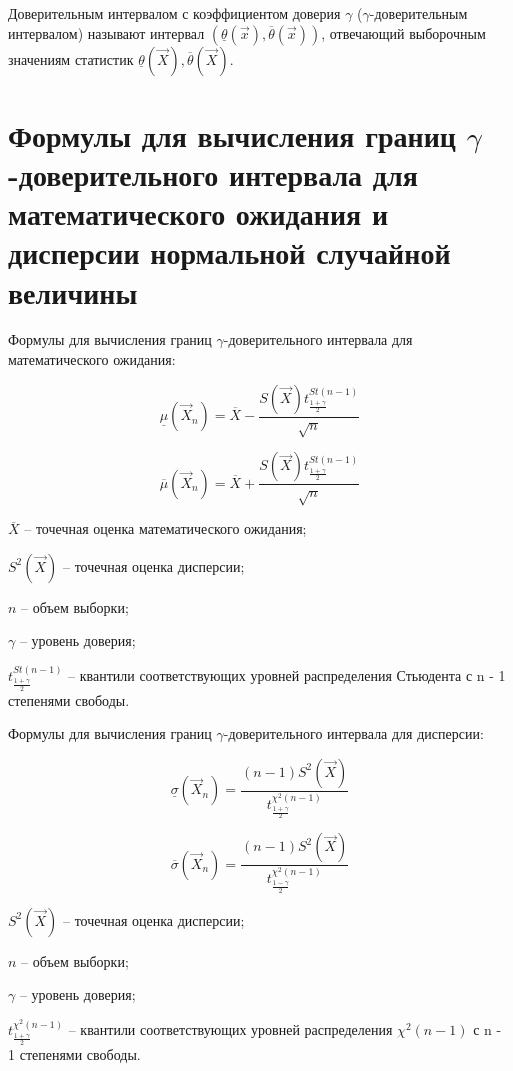 \documentclass[a4paper,oneside,12pt]{extreport}
\theoremstyle{indented}
\begin{document}
Доверительным интервалом с коэффициентом доверия $\gamma$ ($\gamma$-доверительным интервалом) называют интервал $(\underline{\theta}(\vec x), \overline{\theta}(\vec x))$, отвечающий выборочным значениям статистик $\underline{\theta}(\vec X), \overline{\theta}(\vec X)$. 

\section{Формулы для вычисления границ $\gamma$-доверительного интервала для математического ожидания и дисперсии нормальной случайной величины}

Формулы для вычисления границ $\gamma$-доверительного интервала для математического ожидания:

$$
\underline\mu(\vec X_n)=\overline X - \frac{S(\vec X)t^{St(n-1)}_{\frac{1+\gamma}{2}}}{\sqrt{n}}
$$

$$
\overline\mu(\vec X_n)=\overline X + \frac{S(\vec X)t^{St(n-1)}_{\frac{1+\gamma}{2}}}{\sqrt{n}}
$$

$\overline X$ -- точечная оценка математического ожидания;

$S^2(\vec X)$ -- точечная оценка дисперсии;

$n$ -- объем выборки;

$\gamma$ -- уровень доверия;

$t^{St(n-1)}_{\frac{1+\gamma}{2}}$ -- квантили соответствующих уровней распределения Стьюдента с n - 1 степенями свободы.

Формулы для вычисления границ $\gamma$-доверительного интервала для дисперсии:

$$
\underline\sigma(\vec X_n)= \frac{(n-1)S^2(\vec X)}{t^{\chi^2(n-1)}_{\frac{1+\gamma}{2}}}
$$

$$
\overline\sigma(\vec X_n)= \frac{(n-1)S^2(\vec X)}{t^{\chi^2(n-1)}_{\frac{1-\gamma}{2}}}
$$

$S^2(\vec X)$ -- точечная оценка дисперсии;

$n$ -- объем выборки;

$\gamma$ -- уровень доверия;

$t^{\chi^2(n-1)}_{\frac{1+\gamma}{2}}$ -- квантили соответствующих уровней распределения $\chi^2(n-1)$ с n - 1 степенями свободы.
\end{document}
